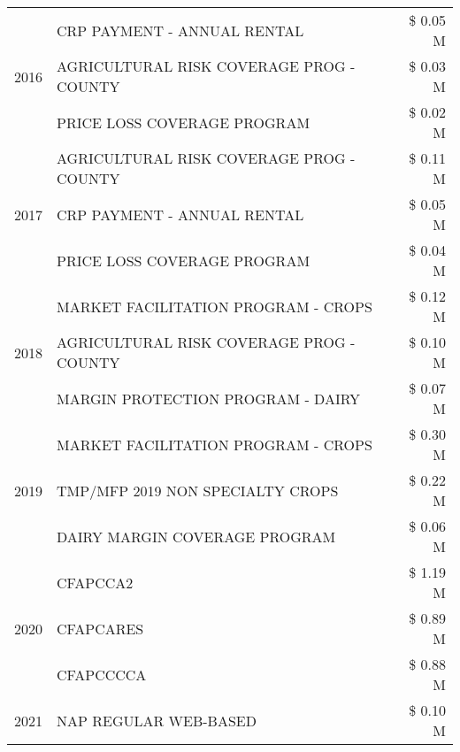 \begin{tabular}{llr}
\cline{1-3}
\multirow[t]{3}{*}{2016} & CRP PAYMENT - ANNUAL RENTAL & \$ 0.05 M \\
 & AGRICULTURAL RISK COVERAGE PROG - COUNTY & \$ 0.03 M \\
 & PRICE LOSS COVERAGE PROGRAM & \$ 0.02 M \\
\cline{1-3}
\multirow[t]{3}{*}{2017} & AGRICULTURAL RISK COVERAGE PROG - COUNTY & \$ 0.11 M \\
 & CRP PAYMENT - ANNUAL RENTAL & \$ 0.05 M \\
 & PRICE LOSS COVERAGE PROGRAM & \$ 0.04 M \\
\cline{1-3}
\multirow[t]{3}{*}{2018} & MARKET FACILITATION PROGRAM - CROPS & \$ 0.12 M \\
 & AGRICULTURAL RISK COVERAGE PROG - COUNTY & \$ 0.10 M \\
 & MARGIN PROTECTION PROGRAM - DAIRY & \$ 0.07 M \\
\cline{1-3}
\multirow[t]{3}{*}{2019} & MARKET FACILITATION PROGRAM - CROPS & \$ 0.30 M \\
 & TMP/MFP 2019 NON SPECIALTY CROPS & \$ 0.22 M \\
 & DAIRY MARGIN COVERAGE PROGRAM & \$ 0.06 M \\
\cline{1-3}
\multirow[t]{3}{*}{2020} & CFAPCCA2 & \$ 1.19 M \\
 & CFAPCARES & \$ 0.89 M \\
 & CFAPCCCCA & \$ 0.88 M \\
\cline{1-3}
2021 & NAP REGULAR WEB-BASED & \$ 0.10 M \\
\cline{1-3}
\bottomrule
\end{tabular}
